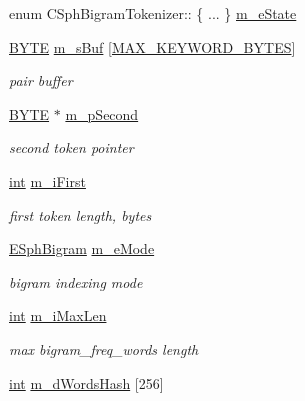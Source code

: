 \begin{DoxyCompactItemize}
\item 
enum C\-Sph\-Bigram\-Tokenizer\-:: \{ ... \}  \hyperlink{classCSphBigramTokenizer_a927126ea4786d959bb574ae2981b64e4}{m\-\_\-e\-State}
\item 
\hyperlink{sphinxstd_8h_a4ae1dab0fb4b072a66584546209e7d58}{B\-Y\-T\-E} \hyperlink{classCSphBigramTokenizer_abd50444095d9fc8a7436e4bf8066d0d8}{m\-\_\-s\-Buf} \mbox{[}\hyperlink{sphinx_8cpp_aeb328d19a9780d5c5defcd7e9b08239b}{M\-A\-X\-\_\-\-K\-E\-Y\-W\-O\-R\-D\-\_\-\-B\-Y\-T\-E\-S}\mbox{]}
\begin{DoxyCompactList}\small\item\em pair buffer \end{DoxyCompactList}\item 
\hyperlink{sphinxstd_8h_a4ae1dab0fb4b072a66584546209e7d58}{B\-Y\-T\-E} $\ast$ \hyperlink{classCSphBigramTokenizer_ab0f20a5139727c93bf3b4a4d9bb1eeaa}{m\-\_\-p\-Second}
\begin{DoxyCompactList}\small\item\em second token pointer \end{DoxyCompactList}\item 
\hyperlink{sphinxexpr_8cpp_a4a26e8f9cb8b736e0c4cbf4d16de985e}{int} \hyperlink{classCSphBigramTokenizer_a15614fd61426d2aa7e489adbd40e234f}{m\-\_\-i\-First}
\begin{DoxyCompactList}\small\item\em first token length, bytes \end{DoxyCompactList}\item 
\hyperlink{sphinx_8h_a4900146967791908ab838925add48e43}{E\-Sph\-Bigram} \hyperlink{classCSphBigramTokenizer_a07c3c025edb022bb4be3e6a959bcc9ba}{m\-\_\-e\-Mode}
\begin{DoxyCompactList}\small\item\em bigram indexing mode \end{DoxyCompactList}\item 
\hyperlink{sphinxexpr_8cpp_a4a26e8f9cb8b736e0c4cbf4d16de985e}{int} \hyperlink{classCSphBigramTokenizer_a91b8c82bbaf189e3fdd87288ab75a050}{m\-\_\-i\-Max\-Len}
\begin{DoxyCompactList}\small\item\em max bigram\-\_\-freq\-\_\-words length \end{DoxyCompactList}\item 
\hyperlink{sphinxexpr_8cpp_a4a26e8f9cb8b736e0c4cbf4d16de985e}{int} \hyperlink{classCSphBigramTokenizer_a820f4e5e208fe9668b7716dbb956753e}{m\-\_\-d\-Words\-Hash} \mbox{[}256\mbox{]}

\end{DoxyCompactItemize}
